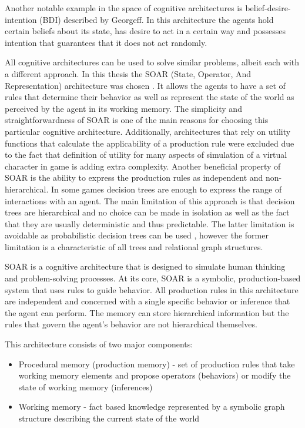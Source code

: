 Another notable example in the space of cognitive architectures is belief-desire-intention (BDI) described by Georgeff\cite{georgeff1992abstract}.
In this architecture the agents hold certain beliefs about its state, has desire to act in a certain way and possesses intention that guarantees that it does not act randomly.

All cognitive architectures can be used to solve similar problems, albeit each with a different approach.
In this thesis the SOAR (State, Operator, And Representation) architecture was chosen \cite{laird2019soar}.
It allows the agents to have a set of rules that determine their behavior as well as represent the state of the world as perceived by the agent in its working memory.
The simplicity and straightforwardness of SOAR is one of the main reasons for choosing this particular cognitive architecture.
Additionally, architectures that rely on utility functions that calculate the applicability of a production rule were excluded due to the fact that definition of utility for many aspects of simulation of a virtual character in game is adding extra complexity.
Another beneficial property of SOAR is the ability to express the production rules as independent and non-hierarchical.
In some games decision trees are enough to express the range of interactions with an agent\cite{sweetser2002current}.
The main limitation of this approach is that decision trees are hierarchical and no choice can be made in isolation as well as the fact that they are usually deterministic and thus predictable.
The latter limitation is avoidable as probabilistic decision trees can be used \cite{saks1986probabilistic}, however the former limitation is a characteristic of all trees and relational graph structures.

SOAR is a cognitive architecture that is designed to simulate human thinking and problem-solving processes.
At its core, SOAR is a symbolic, production-based system that uses rules to guide behavior.
All production rules in this architecture are independent and concerned with a single specific behavior or inference that the agent can perform.
The memory can store hierarchical information but the rules that govern the agent's behavior are not hierarchical themselves.

This architecture consists of two major components:

\begin{itemize}
    \item Procedural memory (production memory) - set of production rules that take working memory elements and propose operators (behaviors) or modify the state of working memory (inferences)
    \item Working memory - fact based knowledge represented by a symbolic graph structure describing the current state of the world
\end{itemize}

